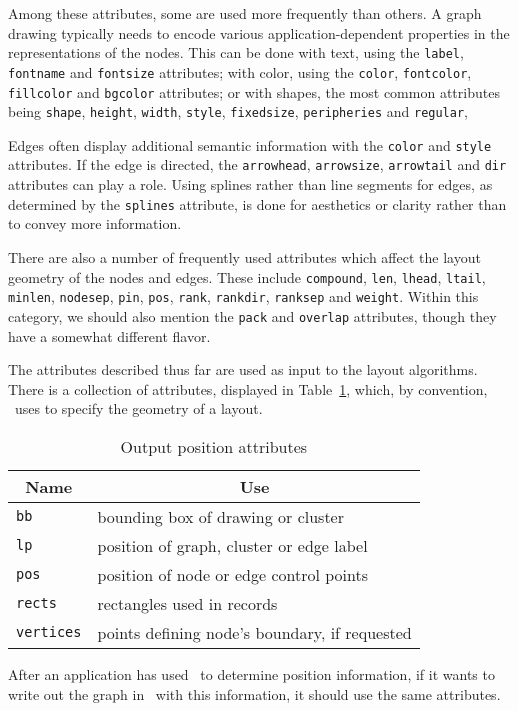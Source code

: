 Among these attributes, some are used more frequently than others.
A graph drawing typically needs to encode various application-dependent
properties in the representations of the nodes. This can be done 
with text, using the {\tt label}, {\tt fontname} and {\tt fontsize} 
attributes; with color, using the {\tt color}, {\tt fontcolor}, 
{\tt fillcolor} and {\tt bgcolor} attributes; or with
shapes, the most common attributes being {\tt shape}, {\tt height},
{\tt width}, {\tt style}, {\tt fixedsize}, {\tt peripheries} and {\tt regular},

Edges often display additional semantic information with the
{\tt color} and {\tt style} attributes. If the edge is directed,
the {\tt arrowhead}, {\tt arrowsize}, {\tt arrowtail} and {\tt dir}
attributes can play a role. Using splines rather than line segments
for edges, as determined by the {\tt splines} attribute, is done
for aesthetics or clarity rather than to convey more information.

There are also a number of frequently used attributes which affect
the layout geometry of the nodes and edges. These include
{\tt compound}, {\tt len}, {\tt lhead}, {\tt ltail}, {\tt minlen},
{\tt nodesep}, {\tt pin}, {\tt pos}, {\tt rank}, {\tt rankdir}, {\tt ranksep}
and {\tt weight}. Within this category, we should also mention the
{\tt pack} and {\tt overlap} attributes, though they have a somewhat
different flavor.

The attributes described thus far are used as input to the layout algorithms.
There is a collection of attributes, displayed in Table~\ref{tab:write}, 
which, by convention, \gviz\ uses to specify the geometry of a layout. 
\begin{table}[htbp]\footnotesize
\centering
\begin{tabular}[t]{|l|p{3.5in}|} \hline
\multicolumn{1}{|c|}{Name} & \multicolumn{1}{c|}{Use} \\ \hline
{\tt bb} &  bounding box of drawing or cluster \\
{\tt lp} & position of graph, cluster or edge label \\
{\tt pos} & position of node or edge control points \\
{\tt rects} & rectangles used in records \\
{\tt vertices} & points defining node's boundary, if requested \\
\hline
\end{tabular}
\caption{Output position attributes}
\label{tab:write}
\end{table}
After an application has used \gviz\ to determine position information, 
if it wants to write out the graph in \DOT\ with this information, it should
use the same attributes.
 
